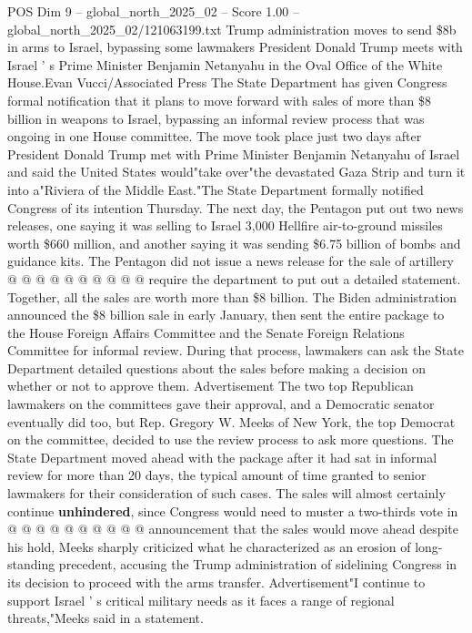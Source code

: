 \begin{textsample}{POS Dim 9 – global\_north\_2025\_02 – Score 1.00 – global\_north\_2025\_02/121063199.txt}  \label{ex:f9_pos_442}
Trump administration moves to send \$8b in arms to Israel, bypassing some lawmakers President Donald Trump meets with Israel ' s Prime Minister Benjamin Netanyahu in the Oval Office of the White House.Evan Vucci/Associated Press The State Department has given Congress formal notification that it plans to move forward with sales of more than \$8 billion in weapons to Israel, bypassing an informal review process that was ongoing in one House committee.
The move took place just two days after President Donald Trump met with Prime Minister Benjamin Netanyahu of Israel and said the United States would"take over"the devastated Gaza Strip and turn it into a"Riviera of the Middle East."The State Department formally notified Congress of its intention Thursday.
The next day, the Pentagon put out two news releases, one saying it was selling to Israel 3,000 Hellfire air-to-ground missiles worth \$660 million, and another saying it was sending \$6.75 billion of bombs and guidance kits.
The Pentagon did not issue a news release for the sale of artillery @ @ @ @ @ @ @ @ @ @ require the department to put out a detailed statement.
Together, all the sales are worth more than \$8 billion.
The Biden administration announced the \$8 billion sale in early January, then sent the entire package to the House Foreign Affairs Committee and the Senate Foreign Relations Committee for informal review.
During that process, lawmakers can ask the State Department detailed questions about the sales before making a decision on whether or not to approve them.
Advertisement The two top Republican lawmakers on the committees gave their approval, and a Democratic senator eventually did too, but Rep.
Gregory W.
Meeks of New York, the top Democrat on the committee, decided to use the review process to ask more questions.
The State Department moved ahead with the package after it had sat in informal review for more than 20 days, the typical amount of time granted to senior lawmakers for their consideration of such cases.
The sales will almost certainly continue \textbf{unhindered}, since Congress would need to muster a two-thirds vote in @ @ @ @ @ @ @ @ @ @ announcement that the sales would move ahead despite his hold, Meeks sharply criticized what he characterized as an erosion of long-standing precedent, accusing the Trump administration of sidelining Congress in its decision to proceed with the arms transfer.
Advertisement"I continue to support Israel ' s critical military needs as it faces a range of regional threats,"Meeks said in a statement.

\end{textsample}

